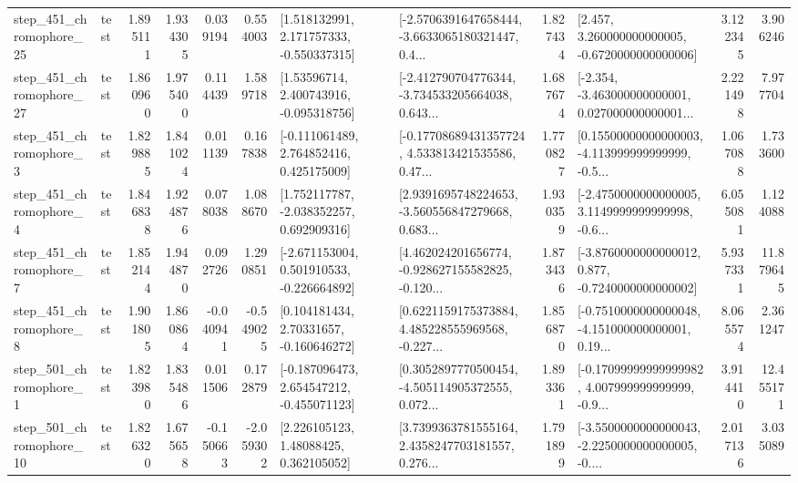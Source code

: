 \begin{tabular}{llrrrrllrlrr}
  step\_451\_chromophore\_25 &      test &      1.895111 &    1.934305 &      0.039194 &  0.554003 &    [1.518132991, 2.171757333, -0.550337315] &  [-2.5706391647658444, -3.6633065180321447, 0.4... &       1.827434 &    [2.457, 3.260000000000005, -0.6720000000000006] &            3.122345 &          3.906246 \\
  step\_451\_chromophore\_27 &      test &      1.860960 &    1.975400 &      0.114439 &  1.589718 &     [1.53596714, 2.400743916, -0.095318756] &  [-2.412790704776344, -3.734533205664038, 0.643... &       1.687674 &  [-2.354, -3.463000000000001, 0.027000000000001... &            2.221498 &          7.977704 \\
   step\_451\_chromophore\_3 &      test &      1.829885 &    1.841024 &      0.011139 &  0.167838 &    [-0.111061489, 2.764852416, 0.425175009] &  [-0.17708689431357724, 4.533813421535586, 0.47... &       1.770827 &  [0.15500000000000003, -4.113999999999999, -0.5... &            1.067088 &          1.733600 \\
   step\_451\_chromophore\_4 &      test &      1.846838 &    1.924876 &      0.078038 &  1.088670 &    [1.752117787, -2.038352257, 0.692909316] &  [2.9391695748224653, -3.560556847279668, 0.683... &       1.930359 &  [-2.4750000000000005, 3.1149999999999998, -0.6... &            6.055081 &          1.124088 \\
   step\_451\_chromophore\_7 &      test &      1.852144 &    1.944870 &      0.092726 &  1.290851 &   [-2.671153004, 0.501910533, -0.226664892] &  [4.462024201656774, -0.928627155582825, -0.120... &       1.873436 &  [-3.8760000000000012, 0.877, -0.7240000000000002] &            5.937331 &         11.879645 \\
   step\_451\_chromophore\_8 &      test &      1.901805 &    1.860864 &     -0.040941 & -0.549025 &     [0.104181434, 2.70331657, -0.160646272] &  [0.6221159175373884, 4.485228555969568, -0.227... &       1.856870 &  [-0.7510000000000048, -4.151000000000001, 0.19... &            8.065574 &          2.361247 \\
   step\_501\_chromophore\_1 &      test &      1.823980 &    1.835486 &      0.011506 &  0.172879 &   [-0.187096473, 2.654547212, -0.455071123] &  [0.3052897770500454, -4.505114905372555, 0.072... &       1.893361 &  [-0.17099999999999982, 4.007999999999999, -0.9... &            3.914410 &         12.455171 \\
  step\_501\_chromophore\_10 &      test &      1.826320 &    1.675658 &     -0.150663 & -2.059302 &      [2.226105123, 1.48088425, 0.362105052] &  [3.7399363781555164, 2.4358247703181557, 0.276... &       1.791899 &  [-3.5500000000000043, -2.2250000000000005, -0.... &            2.017136 &          3.035089 \\

\end{tabular}
